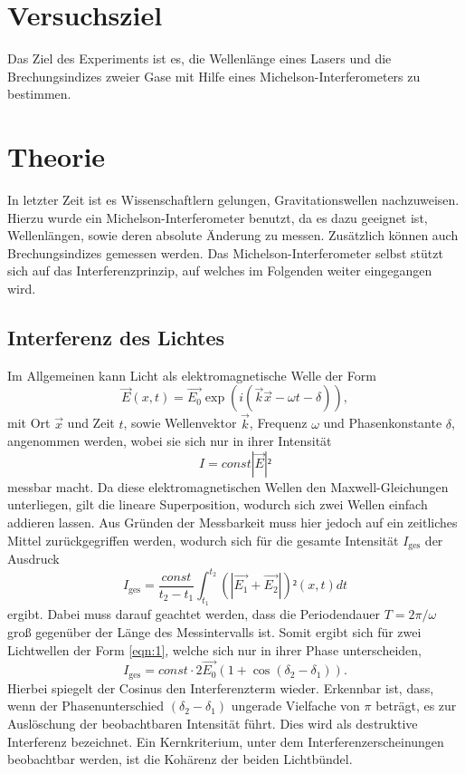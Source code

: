 \section{Versuchsziel}
\label{sec:Versuchsziel}
Das Ziel des Experiments ist es, die Wellenlänge eines Lasers und die Brechungsindizes zweier Gase mit Hilfe eines Michelson-Interferometers zu bestimmen.

\section{Theorie}
\label{sec:Theorie}

In letzter Zeit ist es Wissenschaftlern gelungen, Gravitationswellen nachzuweisen.
Hierzu wurde ein Michelson-Interferometer benutzt, da es dazu geeignet ist, Wellenlängen, sowie deren absolute Änderung zu messen.
Zusätzlich können auch Brechungsindizes gemessen werden.
Das Michelson-Interferometer selbst stützt sich auf das Interferenzprinzip, auf welches im Folgenden weiter eingegangen wird.\\
\subsection{Interferenz des Lichtes}
Im Allgemeinen kann Licht als elektromagnetische Welle der Form
\begin{equation}
  \vec{E}(x,t) = \vec{E_0}\exp{(i(\vec{k}\vec{x}-\omega t -\delta))}, \label{eqn:1}
\end{equation}
mit Ort $\vec{x}$ und Zeit $t$, sowie Wellenvektor $\vec{k}$, Frequenz $\omega$ und Phasenkonstante $\delta$, angenommen werden, wobei sie sich nur in ihrer Intensität
\begin{equation}
  I = const |\vec{E}|²
\end{equation}
messbar macht.
Da diese elektromagnetischen Wellen den Maxwell-Gleichungen unterliegen, gilt die lineare Superposition, wodurch sich zwei Wellen einfach addieren lassen.
Aus Gründen der Messbarkeit muss hier jedoch auf ein zeitliches Mittel zurückgegriffen werden, wodurch sich für die gesamte Intensität $I_{\text{ges}}$ der Ausdruck
\begin{equation}
  I_{\text{ges}} = \frac{const}{t_2-t_1} \int_{t_1}^{t_2} (|\vec{E_1}+\vec{E_2}|)²(x,t) dt
\end{equation}
ergibt. Dabei muss darauf geachtet werden, dass die Periodendauer $T = 2\pi/\omega$ groß gegenüber der Länge des Messintervalls ist.
Somit ergibt sich für zwei Lichtwellen der Form \eqref{eqn:1}, welche sich nur in ihrer Phase unterscheiden,
\begin{equation}
  I_{\text{ges}} = const \cdot 2\vec{E_0}(1+\cos{(\delta_2-\delta_1)}).
\end{equation}
Hierbei spiegelt der Cosinus den Interferenzterm wieder.
Erkennbar ist, dass, wenn der Phasenunterschied $(\delta_2-\delta_1)$ ungerade Vielfache von $\pi$ beträgt, es zur Auslöschung der beobachtbaren Intensität führt.
Dies wird als destruktive Interferenz bezeichnet.
Ein Kernkriterium, unter dem Interferenzerscheinungen beobachtbar werden, ist die Kohärenz der beiden Lichtbündel.\\

